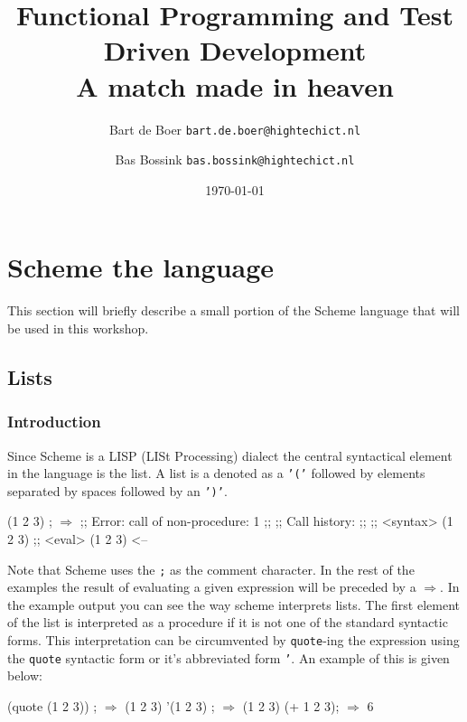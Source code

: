 \documentclass[12pt,a4paper,english,twoside]{article}
\author{
    Bart de Boer \texttt{bart.de.boer@hightechict.nl}
    \and
    Bas Bossink \texttt{bas.bossink@hightechict.nl}
}
\date{\today}
\title{Functional Programming and Test Driven Development\\
\vspace{2 mm} {\large A match made in heaven}}
\begin{document}
\maketitle
\section{Scheme the language}
This section will briefly describe a small portion of the Scheme language that will be used in this workshop.
\subsection{Lists}
\subsubsection{Introduction}
Since Scheme is a LISP (LISt Processing) dialect the central syntactical element in the language is the list. A list is a denoted as a \texttt{'('} followed by elements separated by spaces followed by an \texttt{')'}.
\begin{schemecode}
(1 2 3) ; $\Rightarrow$ 
;;	Error: call of non-procedure: 1
;;
;;	Call history:
;;
;;	<syntax>	  (1 2 3)
;;	<eval>	  (1 2 3)	<--

\end{schemecode}
Note that Scheme uses the \texttt{;} as the comment character. In the rest of the examples the result of evaluating a given expression will be preceded by a $\Rightarrow$. In the example output you can see the way scheme interprets lists. The first element of the list is interpreted as a procedure if it is not one of the standard syntactic forms. This interpretation can be circumvented by \texttt{quote}-ing the expression using the \texttt{quote} syntactic form or it's abbreviated form \texttt{'}. An example of this is given below:
\begin{schemecode}
(quote (1 2 3)) ; $\Rightarrow$ (1 2 3)
'(1 2 3) ; $\Rightarrow$ (1 2 3)
(+ 1 2 3); $\Rightarrow$ 6
\end{schemecode}
\end{document}
